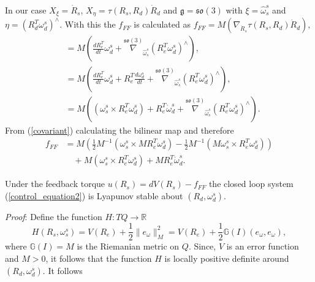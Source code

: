 \documentclass{ifacconf}
\begin{document}
In our case $X_{\xi} = \dot{R}_{s}$, $X_{\eta} = \tau(R_{s},R_{d})\dot{R}_{d}$ and $\mathfrak{g} = \mathfrak{so}(3)$ with $\xi=\widehat{\omega}_{s}^{s}$ and $\eta = (R_{d}^{T}\omega_{d}^{s})^{\wedge}$. With this the $f_{FF}$ is calculated as $f_{FF} = M \left( \nabla_{\dot{R}_{s}}\tau(R_{s},R_{d})\dot{R}_{d} \right), $
\begin{align}
& = M \left( \frac{d R_{e}^{T}}{dt} \omega_{d}^{s} + \overset{\mathfrak{so}(3)}{\nabla}_{\widehat{\omega}_{s}^{s}}(R_{e}^{T}\omega_{d}^{s})^{\wedge} \right), \nonumber \\
& = M \left( \frac{d R_{e}^{T}}{dt}\omega_{d}^{s} + R_{e}^{T} \frac{d \omega_{d}^{s}}{dt} + \overset{\mathfrak{so}(3)}{\nabla}_{\widehat{\omega}_{s}^{s}}(R_{e}^{T}\omega_{d}^{s})^{\wedge} \right), \nonumber \\
& =  M \left( (\omega_{s}^{s} \times R_{e}^{T}\omega_{d}^{s}) + R_{e}^{T}\dot{\omega}_{d}^{s} +\overset{\mathfrak{so}(3)}{\nabla}_{\widehat{\omega}_{s}^{s}}(R_{e}^{T}\omega_{d}^{s})^{\wedge} \right).\nonumber 
\end{align}
From (\ref{covariant}) calculating the bilinear map and therefore 
\begin{align}
f_{FF} &= M \left(\frac{1}{2} M^{-1}(\omega_{s}^{s} \times M R_{e}^{T}\omega_{d}^{s}) - \frac{1}{2} M^{-1}(M\omega_{s}^{s} \times R_{e}^{T}\omega_{d}^{s})\right) \nonumber \\
& \quad + M (\omega_{s}^{s} \times R_{e}^{T}\omega_{d}^{s}) + M R_{e}^{T}\dot{\omega}_{d}^{s}. \label{feedfrwd}
\end{align}
\begin{thm}
Under the feedback torque $u(R_{s}) = dV(R_{s}) - f_{FF}$ the closed loop system (\ref{control_equation2}) is Lyapunov stable about $(R_{d}, \omega_{d}^{s})$.
\end{thm}
\textit{Proof}: Define the function $H : TQ \longrightarrow \mathbb{R}$
\begin{equation}\label{lyapunov_function}
H(R_{s},\omega_{s}^{s}) = V(R_{e}) + \frac{1}{2}\| e_{\omega}\|_{M}^{2} = V(R_{e}) + \frac{1}{2}\mathbb{G}(I)(e_{\omega},e_{\omega}),
\end{equation}
where $\mathbb{G}(I) = M$ is the Riemanian metric on $Q$. Since, $V$ is an error function and $M>0$, it follows that the function $H$ is locally positive definite around $(R_{d}, \omega_{d}^{s})$. It follows
\end{document}
